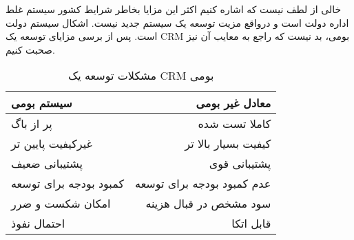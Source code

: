 خالی از لطف نیست که اشاره کنیم اکثر این مزایا بخاطر شرایط کشور  سیستم غلط اداره دولت است و درواقع مزیت توسعه یک سیستم جدید نیست. اشکال سیستم دولت است.
پس از برسی مزایای توسعه یک CRM بومی، بد نیست که راجع به معایب آن نیز صحبت کنیم.

\begin{table}[H]
	\begin{center}
		\caption{مشکلات توسعه یک CRM بومی}
		\label{tap:old_crm_is_better}
		\begin{tabular}{|l|r|}
			\hline
			سیستم بومی & معادل غیر بومی \\
			\hline
			پر از باگ & کاملا تست شده \\
			\hline
			غیرکیفیت پایین تر & کیفیت بسیار بالا تر \\
			\hline
			پشتیبانی ضعیف & پشتیبانی قوی \\
			\hline
			کمبود بودجه برای توسعه & عدم کمبود بودجه برای توسعه \\
			\hline
			امکان شکست و ضرر & سود مشخص در قبال هزینه \\
			\hline
			احتمال نفوذ & قابل اتکا \\
			\hline
		\end{tabular}
	\end{center}
\end{table}

\clearpage
